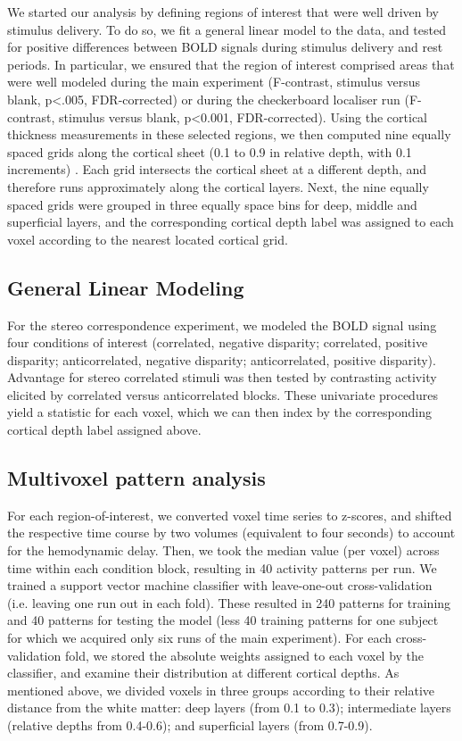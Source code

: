 We started our analysis by defining regions of interest that were well driven by stimulus delivery. To do so, we fit a general linear model to the data, and tested for positive differences between BOLD signals during stimulus delivery and rest periods. In particular, we ensured that the region of interest comprised areas that were well modeled during the main experiment (F-contrast, stimulus versus blank, p<.005, FDR-corrected) or during the checkerboard localiser run (F-contrast, stimulus versus blank, p<0.001, FDR-corrected).
Using the cortical thickness measurements in these selected regions, we then computed nine equally spaced grids along the cortical sheet (0.1 to 0.9 in relative depth, with 0.1 increments) \cite{Zimmermann:2011kl}. Each grid intersects the cortical sheet at a different depth, and therefore runs approximately along the cortical layers. Next, the nine equally spaced grids were grouped in three equally space bins for deep, middle and superficial layers, and the corresponding cortical depth label was assigned to each voxel according to the nearest located cortical grid.

\subsection{General Linear Modeling}
For the stereo correspondence experiment, we modeled the BOLD signal using four conditions of interest (correlated, negative disparity; correlated, positive disparity; anticorrelated, negative disparity; anticorrelated, positive disparity). Advantage for stereo correlated stimuli was then tested by contrasting activity elicited by correlated versus anticorrelated blocks. These univariate procedures yield a statistic for each voxel, which we can then index by the corresponding cortical depth label assigned above.

\subsection{Multivoxel pattern analysis}
For each region-of-interest, we converted voxel time series to z-scores, and shifted the respective time course by two volumes (equivalent to four seconds) to account for the hemodynamic delay. Then, we took the median value (per voxel) across time within each condition block, resulting in 40 activity patterns per run. We trained a support vector machine classifier with leave-one-out cross-validation (i.e. leaving one run out in each fold). These resulted in 240 patterns for training and 40 patterns for testing the model (less 40 training patterns for one subject for which we acquired only six runs of the main experiment). For each cross-validation fold, we stored the absolute weights assigned to each voxel by the classifier, and examine their distribution at different cortical depths. As mentioned above, we divided voxels in three groups according to their relative distance from the white matter: deep layers (from 0.1 to 0.3); intermediate layers (relative depths from 0.4-0.6); and superficial layers (from 0.7-0.9).

